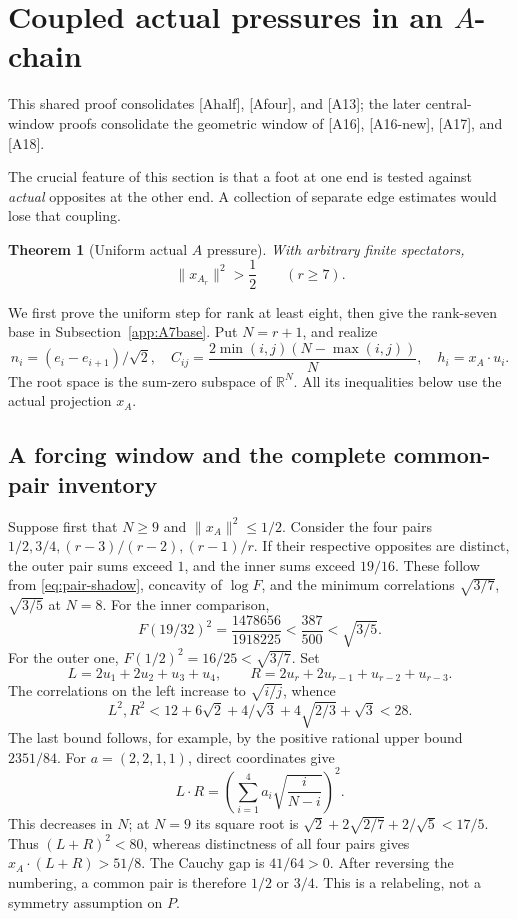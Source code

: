 \documentclass[11pt]{article}
\newtheorem{theorem}{Theorem}[section]
\theoremstyle{definition}
\theoremstyle{remark}
\newcommand{\R}{\mathbb R}
\newcommand{\src}[1]{\textnormal{\textsf{[#1]}}}
\begin{document}
\section{Coupled actual pressures in an \(A\)-chain}\label{app:Achain}

This shared proof consolidates \src{Ahalf}, \src{Afour}, and
\src{A13}; the later central-window proofs consolidate the geometric
window of \src{A16}, \src{A16-new}, \src{A17}, and \src{A18}.

The crucial feature of this section is that a foot at one end is
tested against \emph{actual} opposites at the other end. A collection
of separate edge estimates would lose that coupling.

\begin{theorem}[Uniform actual \(A\) pressure]\label{app:thm:Ahalf}
With arbitrary finite spectators,
\[
 \|x_{A_r}\|^2>\frac12\qquad(r\ge7).
\]
\end{theorem}

We first prove the uniform step for rank at least eight, then give the
rank-seven base in Subsection~\ref{app:A7base}. Put \(N=r+1\), and realize
\[
 n_i=(e_i-e_{i+1})/\sqrt2,\quad
 C_{ij}=\frac{2\min(i,j)(N-\max(i,j))}{N},\quad
 h_i=x_A\cdot u_i .
\]
The root space is the sum-zero subspace of \(\R^N\). All its
inequalities below use the actual projection \(x_A\).

\subsection{A forcing window and the complete common-pair inventory}

Suppose first that \(N\ge9\) and \(\|x_A\|^2\le1/2\). Consider the
four pairs \(1/2,3/4,(r-3)/(r-2),(r-1)/r\).
If their respective opposites are distinct, the outer pair sums
exceed \(1\), and the inner sums exceed \(19/16\). These follow
from \eqref{eq:pair-shadow}, concavity of \(\log F\), and the minimum
correlations \(\sqrt{3/7}\), \(\sqrt{3/5}\) at \(N=8\).
For the inner comparison,
\[
 F(19/32)^2=\frac{1478656}{1918225}
 <\frac{387}{500}<\sqrt{3/5}.
\]
For the outer one, \(F(1/2)^2=16/25<\sqrt{3/7}\).
Set
\[
 L=2u_1+2u_2+u_3+u_4,\qquad
 R=2u_r+2u_{r-1}+u_{r-2}+u_{r-3}.
\]
The correlations on the left increase to \(\sqrt{i/j}\), whence
\[
 L^2,R^2<
 12+6\sqrt2+4/\sqrt3+4\sqrt{2/3}+\sqrt3<28.
\]
The last bound follows, for example, by the positive rational
upper bound \(2351/84\). For \(a=(2,2,1,1)\), direct coordinates give
\[
 L\cdot R=\left(\sum_{i=1}^4a_i\sqrt{\frac{i}{N-i}}\right)^2.
\]
This decreases in \(N\); at \(N=9\) its square root is
\(\sqrt2+2\sqrt{2/7}+2/\sqrt5<17/5\).
Thus \((L+R)^2<80\), whereas distinctness of all four pairs gives
\(x_A\cdot(L+R)>51/8\). The Cauchy gap is \(41/64>0\).
After reversing the numbering, a common pair is therefore \(1/2\)
or \(3/4\). This is a relabeling, not a symmetry assumption on \(P\).
\end{document}
